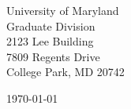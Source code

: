 \begin{minipage}{0.49\textwidth}
\begin{flushleft}
\noindent
University of Maryland \\
Graduate Division\\
2123 Lee Building\\
7809 Regents Drive\\
College Park, MD 20742\\

\end{flushleft}
\end{minipage}
\begin{minipage}{0.47\textwidth}
\begin{flushright}
\today
\end{flushright}
\end{minipage} \\

\newcommand{\univ}{University of Maryland}
\newcommand{\univshort}{UMD}
\newcommand{\degree}{Ph.D.}
\newcommand{\dept}{Computer Science}




